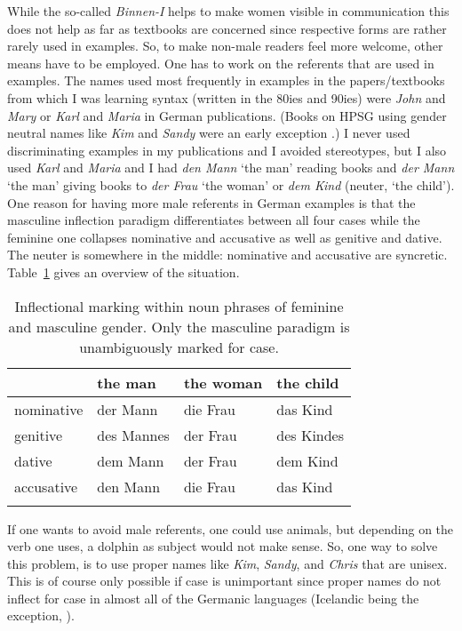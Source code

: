 While the so-called \emph{Binnen-I} helps to make women visible in communication this does not help
as far as textbooks are concerned since respective forms are rather rarely used in examples. So, to
make non-male readers feel more welcome, other means have to be employed. One has to work on the
referents that are used in examples. The names used most frequently in examples in the papers/textbooks from which I was learning syntax
(written in the 80ies and 90ies) were \emph{John} and \emph{Mary} or \emph{Karl} and \emph{Maria} in
German publications. (Books on HPSG using gender neutral names like \emph{Kim} and \emph{Sandy} were an early exception \citep{ps,ps2}.)
I never used discriminating examples in my publications and I avoided stereotypes, but I also used
\emph{Karl} and \emph{Maria} and I had \emph{den Mann} `the man' reading books and \emph{der Mann}
`the man' giving books to \emph{der Frau} `the woman' or \emph{dem Kind} (neuter, `the child'). One
reason for having more male referents in German examples is that the masculine inflection paradigm
differentiates between all four cases while the feminine one collapses nominative and accusative as
well as genitive and dative. The neuter is somewhere in the middle: nominative and accusative are syncretic. Table~\ref{table-German-case-syncretism} gives an overview of the situation.
\begin{table}
\begin{tabular}{llll}\lsptoprule
           & the man    & the woman & the child\\\midrule
nominative & der Mann   & die Frau  & das Kind\\
genitive   & des Mannes & der Frau  & des Kindes\\
dative     & dem Mann   & der Frau  & dem Kind\\
accusative & den Mann   & die Frau  & das Kind\\
\lspbottomrule
\end{tabular}
\caption{\label{table-German-case-syncretism}Inflectional marking within noun phrases of feminine and masculine gender. Only the masculine
  paradigm is unambiguously marked for case.}
\end{table}  
If one wants to avoid male referents, one could use animals, but depending on the verb one
uses, a dolphin as subject would not make sense. So, one way to solve this problem, is to use proper
names like \emph{Kim}, \emph{Sandy}, and \emph{Chris} that are unisex. This is of course only
possible if case is unimportant since proper names do not inflect for case in almost all of the Germanic
languages (Icelandic being the exception, \citealp[]{ZMT85a}). 

